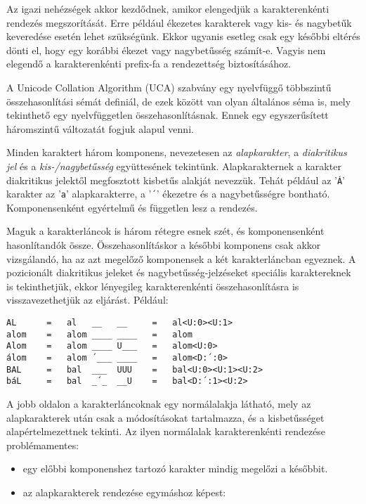 \documentclass[
    parspace,
    noindent,
    nohyp,
]{elteiktdk}[2023/04/10]
\begin{document}

Az igazi nehézségek akkor kezdődnek,
amikor elengedjük a karakterenkénti rendezés megszorítását.
Erre például ékezetes karakterek vagy kis- és nagybetűk keveredése esetén lehet szükségünk.
Ekkor ugyanis esetleg csak egy későbbi eltérés dönti el,
hogy egy korábbi ékezet vagy nagybetűsség számít-e.
Vagyis nem elegendő a karakterenkénti prefix-fa a rendezettség biztosításához.

A Unicode Collation Algorithm (UCA) szabvány egy nyelvfüggő többszintű összehasonlítási sémát definiál,
de ezek között van olyan általános séma is, mely tekinthető egy nyelvfüggetlen összehasonlításnak.
Ennek egy egyszerűsített háromszintű változatát fogjuk alapul venni.

Minden karaktert három komponens,
nevezetesen az \textit{alapkarakter}, a \textit{diakritikus jel}
és a \textit{kis-/nagybetűsség} együttesének tekintünk.
Alapkarakternek a karakter diakritikus jelektől megfosztott kisbetűs alakját nevezzük.
Tehát például az '\texttt{Á}' karakter az '\texttt{a}' alapkarakterre,
a '\texttt{´}' ékezetre és a nagybetűsségre bontható.
Komponensenként egyértelmű és független lesz a rendezés.

Maguk a karakterláncok is három rétegre esnek szét, és komponensenként hasonlítandók össze.
Összehasonlításkor a későbbi komponens csak akkor vizsgálandó,
ha az azt megelőző komponensek a két karakterláncban egyeznek.
A pozicionált diakritikus jeleket és nagybetűsség-jelzéseket speciális karaktereknek is tekinthetjük,
ekkor lényegileg karakterenkénti összehasonlításra is visszavezethetjük az eljárást.
Például:

\begin{verbatim}
AL      =   al   __   __     =   al<U:0><U:1>
alom    =   alom ____ ____   =   alom
Alom    =   alom ____ U___   =   alom<U:0>
álom    =   alom ´___ ____   =   alom<D:´:0>
BAL     =   bal  ___  UUU    =   bal<U:0><U:1><U:2>
báL     =   bal  _´_  __U    =   bal<D:´:1><U:2>
\end{verbatim}

A jobb oldalon a karakterláncoknak egy normálalakja látható,
mely az alapkarakterek után csak a módosításokat tartalmazza,
és a kisbetűsséget alapértelmezettnek tekinti.
Az ilyen normálalak karakterenkénti rendezése problémamentes:

\begin{itemize}
    \item egy előbbi komponenshez tartozó karakter mindig megelőzi a későbbit.
    \item az alapkarakterek rendezése egymáshoz képest: 
\end{itemize}
\end{document}
